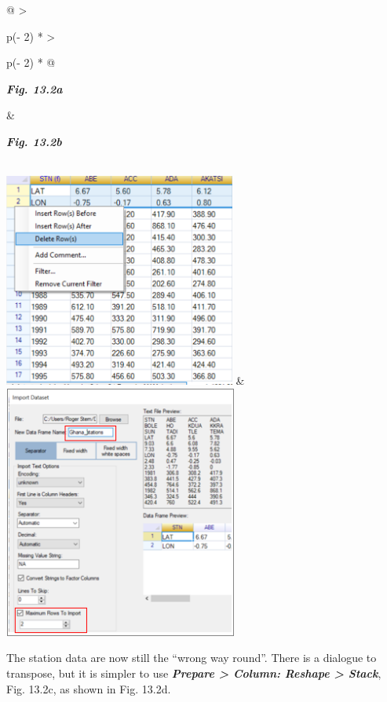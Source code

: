 \documentclass[
  letterpaper,
  DIV=11,
  numbers=noendperiod]{scrreprt}
\begin{document}
\begin{longtable}[]{@{}
  >{\raggedright\arraybackslash}p{(\columnwidth - 2\tabcolsep) * }
  >{\raggedright\arraybackslash}p{(\columnwidth - 2\tabcolsep) * }@{}}
\toprule\noalign{}
\begin{minipage}[b]{\linewidth}\raggedright
\textbf{\emph{Fig. 13.2a}}
\end{minipage} & \begin{minipage}[b]{\linewidth}\raggedright
\textbf{\emph{Fig. 13.2b}}
\end{minipage} \\
\midrule\noalign{}
\endhead
\bottomrule\noalign{}
\endlastfoot
\includegraphics[width=2.99806in,height=2.76823in]{figures/Fig13.2a.png}
&
\includegraphics[width=3.02243in,height=3.2849in]{figures/Fig13.2b.png} \\
\end{longtable}

The station data are now still the ``wrong way round''. There is a
dialogue to transpose, but it is simpler to use \textbf{\emph{Prepare
\textgreater{} Column: Reshape \textgreater{} Stack}}, Fig. 13.2c, as
shown in Fig. 13.2d.
\end{document}

